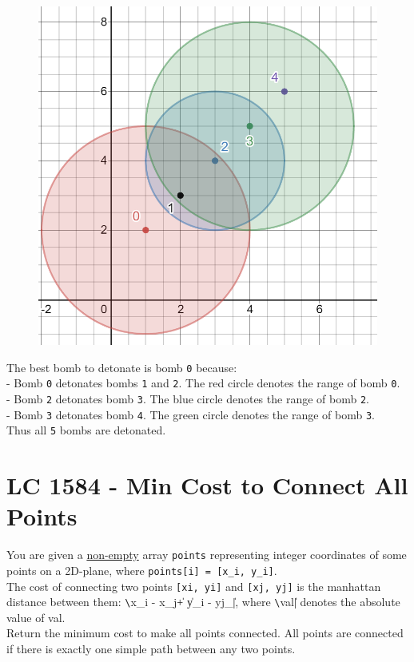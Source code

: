 \begin{itemize}
\begin{figure}[H]
\centering
\includegraphics[width=0.3\linewidth]{images/lc2101_eg3}
\end{figure}
The best bomb to detonate is bomb {\colorbox{CodeBackground}{\lstinline|0|}} because:\\
- Bomb {\colorbox{CodeBackground}{\lstinline|0|}} detonates bombs {\colorbox{CodeBackground}{\lstinline|1|}} and {\colorbox{CodeBackground}{\lstinline|2|}}. The red circle denotes the range of bomb {\colorbox{CodeBackground}{\lstinline|0|}}.\\
- Bomb {\colorbox{CodeBackground}{\lstinline|2|}} detonates bomb {\colorbox{CodeBackground}{\lstinline|3|}}. The blue circle denotes the range of bomb {\colorbox{CodeBackground}{\lstinline|2|}}.\\
- Bomb {\colorbox{CodeBackground}{\lstinline|3|}} detonates bomb {\colorbox{CodeBackground}{\lstinline|4|}}. The green circle denotes the range of bomb {\colorbox{CodeBackground}{\lstinline|3|}}.\\
Thus all {\colorbox{CodeBackground}{\lstinline|5|}} bombs are detonated.
\end{itemize}


\section{LC 1584 - Min Cost to Connect All Points}
You are given a \ul{non-empty} array {\colorbox{CodeBackground}{\lstinline|points|}} representing integer coordinates of some points on a 2D-plane, where {\colorbox{CodeBackground}{\lstinline|points[i] = [x_i, y_i]|}}.\\

The cost of connecting two points {\colorbox{CodeBackground}{\lstinline|[xi, yi]|}} and {\colorbox{CodeBackground}{\lstinline|[xj, yj]|}} is the manhattan distance between them: {\colorbox{CodeBackground}{\lstinline|\|x_i - x_j\| + \|y_i - yj_\||}}, where {\colorbox{CodeBackground}{\lstinline|\|val\||}} denotes the absolute value of val.\\

Return the minimum cost to make all points connected. All points are connected if there is exactly one simple path between any two points.

